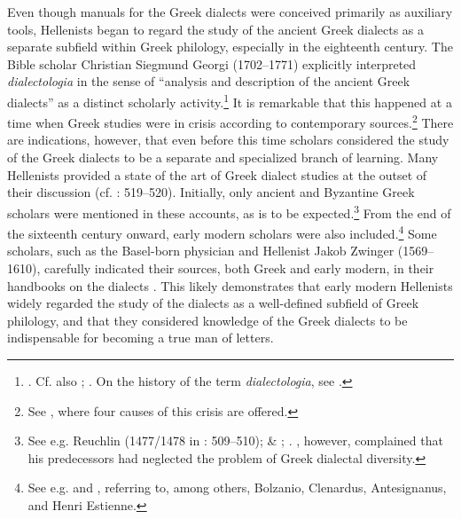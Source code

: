 Even though manuals for the Greek dialects were conceived primarily as auxiliary tools, Hellenists began to regard the study of the ancient Greek dialects as a separate subfield within Greek philology, especially in the eighteenth century. The Bible scholar Christian Siegmund Georgi (1702–1771) explicitly interpreted \textit{dialectologia} in the sense of “analysis and description of the ancient Greek dialects” as a distinct scholarly activity.\footnote{\citet[16]{Georgi1733}. Cf. also \citet[b.1\textsc{\textsuperscript{v}}]{Nibbe1725}; \citet[15]{Hauptmann1737}. On the history of the term \textit{dialectologia}, see \citet[]{VanRooyFcd}.} It is remarkable that this happened at a time when Greek studies were in crisis according to contemporary sources.\footnote{See \citet[86--90]{Reinhard1724}, where four causes of this crisis are offered.} There are indications, however, that even before this time scholars considered the study of the Greek dialects to be a separate and specialized branch of learning. Many Hellenists provided a state of the art of Greek dialect studies at the outset of their discussion (cf. \citealt{VanRooy2014}: 519–520). Initially, only ancient and Byzantine Greek scholars were mentioned in these accounts, as is to be expected.\footnote{See e.g. Reuchlin (1477/1478 in \citealt{VanRooy2014}: 509–510); \citet[\textsc{r.}iii\textsc{\textsuperscript{r}}]{Amerot1520} \&  \citet[title]{Amerot1530}; \citet[α.3\textsc{\textsuperscript{r}}]{Ruland1556}.
\citet[a.3\textsc{\textsuperscript{v}}]{Canini1555}, however, complained that his predecessors had neglected the problem of Greek dialectal diversity.} From the end of the sixteenth century onward, early modern scholars were also included.\footnote{See e.g. \citet[†.7\textsc{\textsuperscript{r}}]{Walper1589} and \citet[1]{Schmidt1604}, referring to, among others, Bolzanio, Clenardus, Antesignanus, and Henri Estienne.} Some scholars, such as the Basel-born physician and Hellenist Jakob Zwinger (1569–1610), carefully indicated their sources, both Greek and early modern, in their handbooks on the dialects \citep{Zwinger1605}. This likely demonstrates that early modern Hellenists widely regarded the study of the dialects as a well-defined subfield of Greek philology, and that they considered knowledge of the Greek dialects to be indispensable for becoming a true man of letters.

